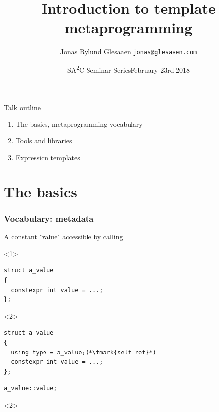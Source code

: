 \documentclass[14pt]{beamer}
\title{Introduction to template metaprogramming}
\author{\texorpdfstring{%
    Jonas Rylund Glesaaen\newline%
    \fontsize{12pt}{12pt}\selectfont\texttt{jonas@glesaaen.com}%
  }{%
    Jonas Rylund Glesaaen}}
\date{\texorpdfstring{%
    SA{\color{SA2COrange}\textsuperscript{2}}C Seminar Series\newline{}February 23rd 2018%
  }{%
    February 23rd 2018}}
\begin{document}
\nocite{*}

\frame{\titlepage}

\begin{frame}{Talk outline}

  \begin{enumerate} \setlength\itemsep{.5em}
    \item The basics, metaprogramming vocabulary
    \item Tools and libraries
    \item Expression templates
  \end{enumerate}
  
\end{frame}

\section{The basics}
\frame{\sectionpage}

\begin{frame}[fragile]
  \frametitle{Vocabulary: metadata}

  A constant "value" accessible by calling 

  \begin{overlayarea}{\textwidth}{4cm}
  \begin{onlyenv}<1>
  \begin{lstlisting}[basicstyle=\codefontsize{12pt}]
struct a_value
{
  constexpr int value = ...;
};
  \end{lstlisting}
  \end{onlyenv}

  \begin{onlyenv}<2>
  \begin{lstlisting}[basicstyle=\codefontsize{12pt}]
struct a_value
{
  using type = a_value;(*\tmark{self-ref}*)
  constexpr int value = ...;
};
  \end{lstlisting}
  \end{onlyenv}

  \begin{lstlisting}[basicstyle=\codefontsize{12pt}]
a_value::value;
  \end{lstlisting}

  \end{overlayarea}

  \begin{onlyenv}<2>
    \nointerlineskip
  \end{onlyenv}

\end{frame}
\end{document}
